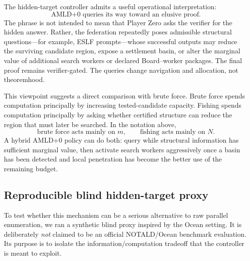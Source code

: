 \documentclass[11pt]{article}
\theoremstyle{definition}
\begin{document}
The hidden-target controller admits a useful operational interpretation:
\[
\boxed{\text{AMLD+0 queries its way toward an elusive proof.}}
\]
The phrase is not intended to mean that Player Zero asks the verifier for the hidden answer.  Rather, the federation repeatedly poses admissible structural questions---for example, ESLF prompts---whose successful outputs may reduce the surviving candidate region, expose a settlement basin, or alter the marginal value of additional search workers or declared Board--worker packages.  The final proof remains verifier-gated.  The queries change navigation and allocation, not theoremhood.

This viewpoint suggests a direct comparison with brute force.  Brute force spends computation principally by increasing tested-candidate capacity.  Fishing spends computation principally by asking whether certified structure can reduce the region that must later be searched.  In the notation above,
\[
\boxed{
\text{brute force acts mainly on }m,
\qquad
\text{fishing acts mainly on }N.
}
\]
A hybrid AMLD+0 policy can do both: query while structural information has sufficient marginal value, then activate search workers aggressively once a basin has been detected and local penetration has become the better use of the remaining budget.

\subsection{Reproducible blind hidden-target proxy}

To test whether this mechanism can be a serious alternative to raw parallel enumeration, we ran a synthetic blind proxy inspired by the Ocean setting. It is deliberately \emph{not} claimed to be an official NOTALD/Ocean benchmark evaluation. Its purpose is to isolate the information/computation tradeoff that the controller is meant to exploit.
\end{document}
